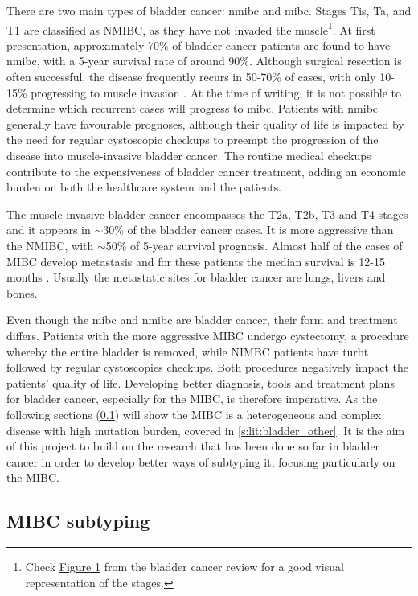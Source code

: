 There are two main types of bladder cancer: \acrfull{nmibc} and \acrfull{mibc}. Stages Tis, Ta, and T1 are classified as NMIBC, as they have not invaded the muscle\footnote{Check \href{https://www.nature.com/articles/nrc3817/figures/1}{Figure 1} from the bladder cancer review \citep{Knowles2015-mu} for a good visual representation of the stages.}. At first presentation, approximately 70\% of bladder cancer patients are found to have \acrshort{nmibc}, with a 5-year survival rate of around 90\%. Although surgical resection is often successful, the disease frequently recurs in 50-70\% of cases, with only 10-15\% progressing to muscle invasion \citep{Knowles2015-mu}. At the time of writing, it is not possible to determine which recurrent cases will progress to \acrshort{mibc}. Patients with \acrshort{nmibc} generally have favourable prognoses, although their quality of life is impacted by the need for regular cystoscopic checkups to preempt the progression of the disease into muscle-invasive bladder cancer. The routine medical checkups contribute to the expensiveness of bladder cancer treatment, adding an economic burden on both the healthcare system and the patients.

The muscle invasive bladder cancer encompasses the T2a, T2b, T3 and T4 stages and it appears in $\sim$30\% of the bladder cancer cases. It is more aggressive than the NMIBC, with $\sim$50\% of 5-year survival prognosis. Almost half of the cases of MIBC develop metastasis and for these patients the median survival is 12-15 months \citep{Knowles2015-mu}. Usually the metastatic sites for bladder cancer are lungs, livers and bones.

Even though the \acrshort{mibc} and \acrshort{nmibc} are bladder cancer, their form and treatment differs. Patients with the more aggressive MIBC undergo cystectomy, a procedure whereby the entire bladder is removed, while NIMBC patients have \acrfull{turbt} followed by regular cystoscopies checkups. Both procedures negatively impact the patients' quality of life. Developing better diagnosis, tools and treatment plans for bladder cancer, especially for the MIBC, is therefore imperative. As the following sections (\cref{s:lit:subtypes_mibc}) will show the MIBC is a heterogeneous and complex disease with high mutation burden, covered in \cref{s:lit:bladder_other}. It is the aim of this project to build on the research that has been done so far in bladder cancer in order to develop better ways of subtyping it, focusing particularly on the MIBC.

\subsection{MIBC subtyping} \label{s:lit:subtypes_mibc}

